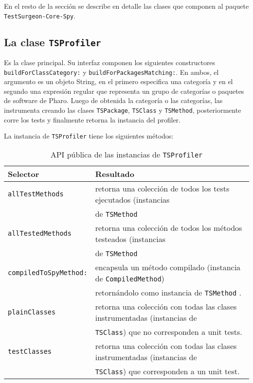 \par En el resto de la sección se describe en detalle las clases que componen al paquete {\tt TestSurgeon-Core-Spy}.

\subsection{La clase {\tt TSProfiler}}

\par Es la clase principal. Su interfaz componen los siguientes constructores {\tt buildForClassCategory:} y {\tt buildForPackagesMatching:}. En ambos, el argumento es un objeto String, en el primero especifica una categoría y en el segundo una expresión regular que representa un grupo de categorías o paquetes de software de Pharo. Luego de obtenida la categoría o las categorías, las instrumenta creando las clases {\tt TSPackage}, {\tt TSClass} y {\tt TSMethod}, posteriormente corre los tests y finalmente retorna la instancia del profiler.

\par La instancia de {\tt TSProfiler} tiene los siguientes métodos:

\begin{table}[h] 
    \centering 
    \begin{tabular}{|l|l|}
    	\hline
\textbf{Selector} & \textbf{Resultado} \\ \hline \hline
{\tt allTestMethods}	& retorna una colección de todos los tests ejecutados (instancias\\
						&  de {\tt TSMethod}  \\ \hline
{\tt allTestedMethods} & retorna una colección de todos los métodos testeados (instancias  \\
						& de {\tt TSMethod} \\ \hline
{\tt compiledToSpyMethod:} & encapsula un método compilado (instancia de {\tt CompiledMethod}) \\
						& retornándolo como instancia de {\tt TSMethod} . \\ \hline
{\tt plainClasses} & retorna una colección con todas las clases instrumentadas (instancias de  \\ 
						&{\tt TSClass}) que no corresponden a unit tests. \\ \hline
{\tt testClasses} & retorna una colección con todas las clases instrumentadas (instancias de \\ 
						&{\tt TSClass}) que corresponden a un unit test. \\ \hline
    \end{tabular}
    \caption{API pública de las instancias de {\tt TSProfiler}}
\end{table} 



